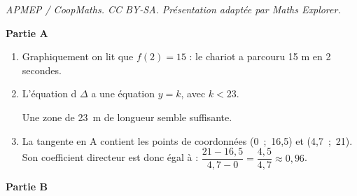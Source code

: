 \documentclass[10pt]{article}
\begin{document}
\noindent\textit{APMEP / CoopMaths. CC BY-SA. Présentation adaptée par Maths Explorer.}\par\medskip
\medskip

\begin{center}\textbf{Partie A} \end{center}

\begin{enumerate}
\item 
Graphiquement on lit que $f(2) = 15$ : le chariot a parcouru 15 m en 2 secondes.
\item 
L'équation d $\Delta$ a une équation $y = k$, avec $k < 23$.

Une zone de 23~m de longueur  semble suffisante.

\item 
La tangente en A contient les points de coordonnées (0~;~16,5) et (4,7~;~21). Son coefficient directeur est donc égal à : $\dfrac{21 - 16,5}{4,7 - 0} = \dfrac{4,5}{4,7} \approx 0,96$.
\end{enumerate}

\begin{center}\textbf{Partie B} \end{center}
\end{document}
